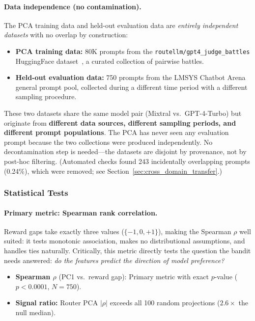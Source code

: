 \paragraph{Data independence (no contamination).}
The PCA training data and held-out evaluation data are \emph{entirely
independent datasets} with no overlap by construction:
\begin{itemize}[leftmargin=*,noitemsep,topsep=0pt]
    \item \textbf{PCA training data:} 80K prompts from the
    \texttt{routellm/gpt4\_judge\_battles} HuggingFace
    dataset~\cite{ong2024routellm}, a curated collection of pairwise battles.
    \item \textbf{Held-out evaluation data:} 750 prompts from the LMSYS Chatbot
    Arena general prompt pool, collected during a different time period with a
    different sampling procedure.
\end{itemize}
\noindent These two datasets share the same model pair (Mixtral vs.\
GPT-4-Turbo) but originate from \textbf{different data sources, different
sampling periods, and different prompt populations}.  The PCA has never seen
any evaluation prompt because the two collections were produced independently.
No decontamination step is needed---the datasets are disjoint by provenance,
not by post-hoc filtering.  (Automated checks found 243 incidentally
overlapping prompts (0.24\%), which were removed; see
Section~\ref{sec:cross_domain_transfer}.)

\subsubsection{Statistical Tests}

\paragraph{Primary metric: Spearman rank correlation.}
Reward gaps take exactly three values ($\{-1, 0, +1\}$), making the Spearman
$\rho$ well suited: it tests monotonic association, makes no distributional
assumptions, and handles ties naturally.  Critically, this metric directly
tests the question the bandit needs answered: \emph{do the features predict the
direction of model preference?}
\begin{itemize}[leftmargin=*,noitemsep,topsep=0pt]
    \item \textbf{Spearman $\rho$} (PC1 vs.\ reward gap): Primary metric
    with exact $p$-value ($p < 0.0001$, $N=750$).
    \item \textbf{Signal ratio:} Router PCA $|\rho|$ exceeds all 100 random
    projections ($2.6\times$ the null median).
\end{itemize}

